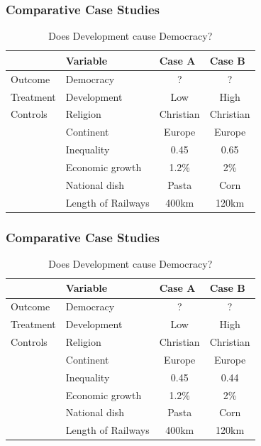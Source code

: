\documentclass[xcolor=x11names,compress]{beamer}\usepackage[]{graphicx}\usepackage[]{color}
\renewcommand{\(}{\begin{columns}}
\renewcommand{\)}{\end{columns}}
\newcommand{\<}[1]{\begin{column}{#1}}
\renewcommand{\>}{\end{column}}
\begin{document}
\begin{frame}
\frametitle{Comparative Case Studies}
\begin{table}[htbp]
  \centering
  \caption{Does Development cause Democracy?}
    \begin{tabular}{|r|l|c|c|}
    \hline
          & Variable & \multicolumn{1}{l|}{Case A} & \multicolumn{1}{l|}{Case B} \bigstrut\\
    \hline
    \multicolumn{1}{|l|}{Outcome} & Democracy & ?     & ? \bigstrut\\
    \hline
    \multicolumn{1}{|l|}{Treatment} & Development & Low   & High \bigstrut\\
    \hline
    \multicolumn{1}{|l|}{Controls} & Religion & Christian & Christian \bigstrut\\
    \hline
          & Continent & Europe & Europe \bigstrut\\
    \hline
          & Inequality & 0.45  & 0.65 \bigstrut\\
    \hline
          & Economic growth & 1.2\% & 2\% \bigstrut\\
    \hline
          & National dish & Pasta & Corn \bigstrut\\
    \hline
          & Length of Railways & 400km & 120km \bigstrut\\
    \hline
    \end{tabular}%
  \label{tab:addlabel}%
\end{table}%
\end{frame}

\begin{frame}
\frametitle{Comparative Case Studies}
\begin{table}[htbp]
  \centering
  \caption{Does Development cause Democracy?}
    \begin{tabular}{|r|l|c|c|}
    \hline
          & Variable & \multicolumn{1}{l|}{Case A} & \multicolumn{1}{l|}{Case B} \bigstrut\\
    \hline
    \multicolumn{1}{|l|}{Outcome} & Democracy & ?     & ? \bigstrut\\
    \hline
    \multicolumn{1}{|l|}{Treatment} & Development & Low   & High \bigstrut\\
    \hline
    \multicolumn{1}{|l|}{Controls} & Religion & Christian & Christian \bigstrut\\
    \hline
          & Continent & Europe & Europe \bigstrut\\
    \hline
          & Inequality & 0.45  & 0.44 \bigstrut\\
    \hline
          & Economic growth & 1.2\% & 2\% \bigstrut\\
    \hline
          & National dish & Pasta & Corn \bigstrut\\
    \hline
          & Length of Railways & 400km & 120km \bigstrut\\
    \hline
    \end{tabular}%
  \label{tab:addlabel}%
\end{table}%
\end{frame}
\end{document}

